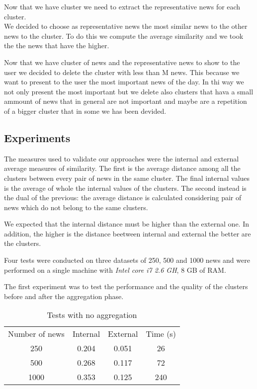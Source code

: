 \documentclass{acm_proc_article-sp}
\begin{document}
Now that we have cluster we need to extract the representative news for each cluster.\\
We decided to choose as representative news the most similar news to the other news to the cluster. To do this we compute the average similarity and we took the the news that have the higher.

Now that we have cluster of news and the representative news to show to the user we decided to delete the cluster with less than M news. This because we want to present to the user the most important news of the day. In thi way we not only present the most important but we delete also clusters that hava a small ammount of news that in general are not important and maybe are a repetition of a bigger cluster that in some we has been devided.

\subsection{Experiments}
\vspace{2mm}
The measures used to validate our approaches were the internal and external average measures of similarity. The first is the average distance among all the clusters between every pair of news in the same cluster. The final internal values is the average of whole the internal values of the clusters. The second instead is the dual of the previous: the average distance is calculated considering pair of news which do not belong to the same clusters.

We expected that the internal distance must be higher than the external one. In addition, the higher is the distance beetween internal and external the better are the clusters.

Four tests were conducted on three datasets of 250, 500 and 1000 news and were performed on a single machine with \textit{Intel core i7 2.6 GH}, 8 GB of RAM.

The first experiment was to test the performance and the quality of the clusters before and after the aggregation phase. 

\begin{table}[!ht]
\centering
\label{table:norea}
\begin{tabular}{cccc}
Number of news & Internal & External & Time (s) \\
250            & 0.204    & 0.051    & 26       \\
500            & 0.268    & 0.117    & 72       \\
1000           & 0.353    & 0.125    & 240      \\ 
\end{tabular}
\caption{Tests with no aggregation}
\end{table}
\end{document}
